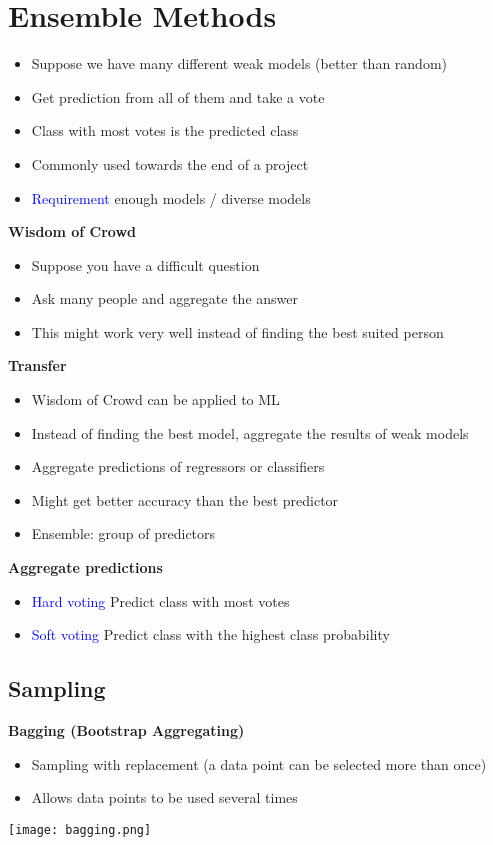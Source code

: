 \section{Ensemble Methods}
\begin{itemize}
    \item Suppose we have many different weak models (better than random)
    \item Get prediction from all of them and take a vote
    \item Class with most votes is the predicted class
    \item Commonly used towards the end of a project
    \item \textcolor{blue}{Requirement} enough models / diverse models
\end{itemize}
\vspace{10pt}
\textbf{Wisdom of Crowd}
\begin{itemize}
    \item Suppose you have a difficult question
    \item Ask many people and aggregate the answer
    \item This might work very well instead of finding the best suited person
\end{itemize}
\vspace{10pt}
\textbf{Transfer}
\begin{itemize}
    \item Wisdom of Crowd can be applied to ML
    \item Instead of finding the best model, aggregate the results of weak models
    \item Aggregate predictions of regressors or classifiers
    \item Might get better accuracy than the best predictor
    \item Ensemble: group of predictors
\end{itemize}
\vspace{10pt}
\textbf{Aggregate predictions}
\begin{itemize}
    \item \textcolor{blue}{Hard voting} Predict class with most votes
    \item \textcolor{blue}{Soft voting} Predict class with the highest class probability
\end{itemize}

\subsection{Sampling}
\textbf{Bagging (Bootstrap Aggregating)}
\begin{itemize}
    \item Sampling with replacement (a data point can be selected more than once)
    \item Allows data points to be used several times
\end{itemize}
\texttt{[image: bagging.png]} \\

